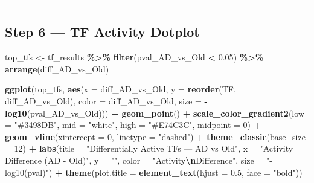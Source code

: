 \documentclass[
]{article}
\newenvironment{Shaded}{\begin{snugshade}}{\end{snugshade}}
\newcommand{\AttributeTok}[1]{\textcolor[rgb]{0.13,0.29,0.53}{#1}}
\newcommand{\DecValTok}[1]{\textcolor[rgb]{0.00,0.00,0.81}{#1}}
\newcommand{\FloatTok}[1]{\textcolor[rgb]{0.00,0.00,0.81}{#1}}
\newcommand{\FunctionTok}[1]{\textcolor[rgb]{0.13,0.29,0.53}{\textbf{#1}}}
\newcommand{\NormalTok}[1]{#1}
\newcommand{\OtherTok}[1]{\textcolor[rgb]{0.56,0.35,0.01}{#1}}
\newcommand{\SpecialCharTok}[1]{\textcolor[rgb]{0.81,0.36,0.00}{\textbf{#1}}}
\newcommand{\StringTok}[1]{\textcolor[rgb]{0.31,0.60,0.02}{#1}}
\begin{document}
\begin{center}\rule{0.5\linewidth}{0.5pt}\end{center}

\subsection{Step 6 --- TF Activity
Dotplot}\label{step-6-tf-activity-dotplot}

\begin{Shaded}
\begin{Highlighting}[]
\NormalTok{top\_tfs }\OtherTok{\textless{}{-}}\NormalTok{ tf\_results }\SpecialCharTok{\%\textgreater{}\%}
    \FunctionTok{filter}\NormalTok{(pval\_AD\_vs\_Old }\SpecialCharTok{\textless{}} \FloatTok{0.05}\NormalTok{) }\SpecialCharTok{\%\textgreater{}\%}
    \FunctionTok{arrange}\NormalTok{(diff\_AD\_vs\_Old)}

\FunctionTok{ggplot}\NormalTok{(top\_tfs,}
       \FunctionTok{aes}\NormalTok{(}\AttributeTok{x =}\NormalTok{ diff\_AD\_vs\_Old,}
           \AttributeTok{y =} \FunctionTok{reorder}\NormalTok{(TF, diff\_AD\_vs\_Old),}
           \AttributeTok{color =}\NormalTok{ diff\_AD\_vs\_Old,}
           \AttributeTok{size  =} \SpecialCharTok{{-}}\FunctionTok{log10}\NormalTok{(pval\_AD\_vs\_Old))) }\SpecialCharTok{+}
    \FunctionTok{geom\_point}\NormalTok{() }\SpecialCharTok{+}
    \FunctionTok{scale\_color\_gradient2}\NormalTok{(}\AttributeTok{low =} \StringTok{"\#3498DB"}\NormalTok{, }\AttributeTok{mid =} \StringTok{"white"}\NormalTok{,}
                          \AttributeTok{high =} \StringTok{"\#E74C3C"}\NormalTok{, }\AttributeTok{midpoint =} \DecValTok{0}\NormalTok{) }\SpecialCharTok{+}
    \FunctionTok{geom\_vline}\NormalTok{(}\AttributeTok{xintercept =} \DecValTok{0}\NormalTok{, }\AttributeTok{linetype =} \StringTok{"dashed"}\NormalTok{) }\SpecialCharTok{+}
    \FunctionTok{theme\_classic}\NormalTok{(}\AttributeTok{base\_size =} \DecValTok{12}\NormalTok{) }\SpecialCharTok{+}
    \FunctionTok{labs}\NormalTok{(}\AttributeTok{title  =} \StringTok{"Differentially Active TFs — AD vs Old"}\NormalTok{,}
         \AttributeTok{x      =} \StringTok{"Activity Difference (AD {-} Old)"}\NormalTok{,}
         \AttributeTok{y      =} \StringTok{""}\NormalTok{,}
         \AttributeTok{color  =} \StringTok{"Activity}\SpecialCharTok{\textbackslash{}n}\StringTok{Difference"}\NormalTok{,}
         \AttributeTok{size   =} \StringTok{"{-}log10(pval)"}\NormalTok{) }\SpecialCharTok{+}
    \FunctionTok{theme}\NormalTok{(}\AttributeTok{plot.title =} \FunctionTok{element\_text}\NormalTok{(}\AttributeTok{hjust =} \FloatTok{0.5}\NormalTok{, }\AttributeTok{face =} \StringTok{"bold"}\NormalTok{))}
\end{Highlighting}
\end{Shaded}
\end{document}
